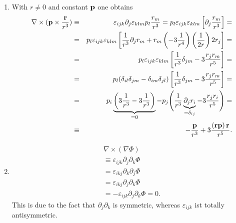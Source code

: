 {\begin{enumerate}
\item    With $r\neq 0$ and constant $\bf p$ one obtains
\begin{eqnarray*}
  \nabla \times ({\bf p} \times \frac{{\bf r}}{r^3}) & \equiv &
  \varepsilon_{ijk}\partial_j\varepsilon_{klm}p_l\frac{r_m}{r^3}=
  p_l \varepsilon_{ijk} \varepsilon_{klm}
  \left[\partial_j\frac{r_m}{r^3}\right]= \\
  & = & p_l
    \varepsilon_{ijk}\varepsilon_{klm}
  \left[
    \frac{1}{r^3}\partial_j r_m + r_m
    \left(-3\frac{1}{r^4}\right)\left(\frac{1}{2r}\right)2r_j
  \right]= \\
  & = & p_l\varepsilon_{ijk}\varepsilon_{klm}
  \left[
    \frac{1}{r^3}\delta_{jm} - 3\frac{r_j r_m}{r^5}
  \right]= \\
  & = & p_l(\delta_{il}\delta_{jm}-\delta_{im}\delta_{jl})
  \left[
    \frac{1}{r^3}\delta_{jm} - 3\frac{r_j r_m}{r^5}
  \right]= \\
  & = & p_i \underbrace{\left(3\frac{1}{r^3}-3\frac{1}{r^3}\right)}_{=0}-
  p_j
  \Biggl({1\over {r^3}}
    \underbrace{{\partial_j r_i}}_{=\delta_{ij}}-
    3\frac{r_j r_i}{r^5}
  \Biggr)= \\
  & \equiv & -\frac{{\bf p}}{r^3}+3\frac{\left({\bf r} {\bf p}\right){\bf r}}{r^5}
.
\end{eqnarray*}



\item
\begin{equation}
\begin{array}{l}
{\nabla} \times({\nabla }\Phi )\\
\equiv
\varepsilon_{ijk} \partial_j \partial_k \Phi \\ =
\varepsilon_{ikj} \partial_k \partial_j \Phi  \\=
\varepsilon_{ikj} \partial_j \partial_k \Phi  \\=
-\varepsilon_{ijk} \partial_j \partial_k \Phi =0.
\end{array}
\end{equation}
This is due to the fact that $\partial_j \partial_k$ is  symmetric, whereas
$\varepsilon_{ijk}$ ist totally antisymmetric.



\end{enumerate}}
